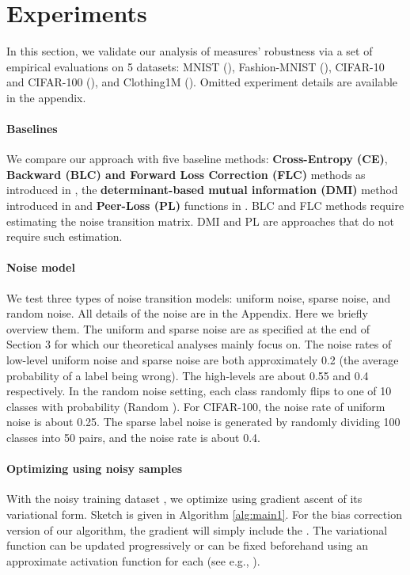 \section{Experiments}\label{sec:exp}
In this section, we validate our analysis of  measures' robustness via a set of empirical evaluations on 5 datasets: MNIST (\cite{lecun1998gradient}), Fashion-MNIST (\cite{xiao2017fashionmnist}), CIFAR-10 and CIFAR-100 (\cite{krizhevsky2009learning}), and Clothing1M (\cite{xiao2015learning}). Omitted experiment details are available in the appendix.

\vspace{-0.1in}
\paragraph{Baselines} We compare our approach with five baseline methods: \textbf{Cross-Entropy (CE)}, \textbf{Backward (BLC) and Forward Loss Correction (FLC)} methods as introduced in \citep{patrini2017making}, the \textbf{determinant-based mutual information (DMI)} method introduced in \citep{xu2019l_dmi} and \textbf{Peer-Loss (PL)} functions in \citep{liu2019peer}. BLC and FLC methods require estimating the noise transition matrix. DMI  and  PL are approaches that do not require such estimation.

\vspace{-0.1in}
\paragraph{Noise model} We test three types of noise transition models: uniform noise, sparse noise, and random noise. All details of the noise are in the Appendix. Here we briefly overview them. The uniform and sparse noise are as specified at the end of Section 3 for which our theoretical analyses mainly focus on. The noise rates of low-level uniform noise and sparse noise are both approximately 0.2 (the average probability of a label being wrong). 
The high-levels are about 0.55 and 0.4 respectively. 
In the random noise setting, each class randomly flips to one of 10 classes with probability  (Random ). For CIFAR-100, the noise rate of uniform noise is about 0.25. The sparse label noise is generated by randomly dividing 100 classes into 50 pairs, and the noise rate is about 0.4. 

\vspace{-0.02in}
\paragraph{Optimizing  using noisy samples}
With the noisy training dataset , we optimize  using gradient ascent of its variational form. Sketch is given in Algorithm \ref{alg:main1}. For the bias correction version of our algorithm, the gradient will simply include the . The variational function  can be updated progressively or can be fixed beforehand using an approximate activation function for each  (see e.g., \citep{nowozin2016f}). 


